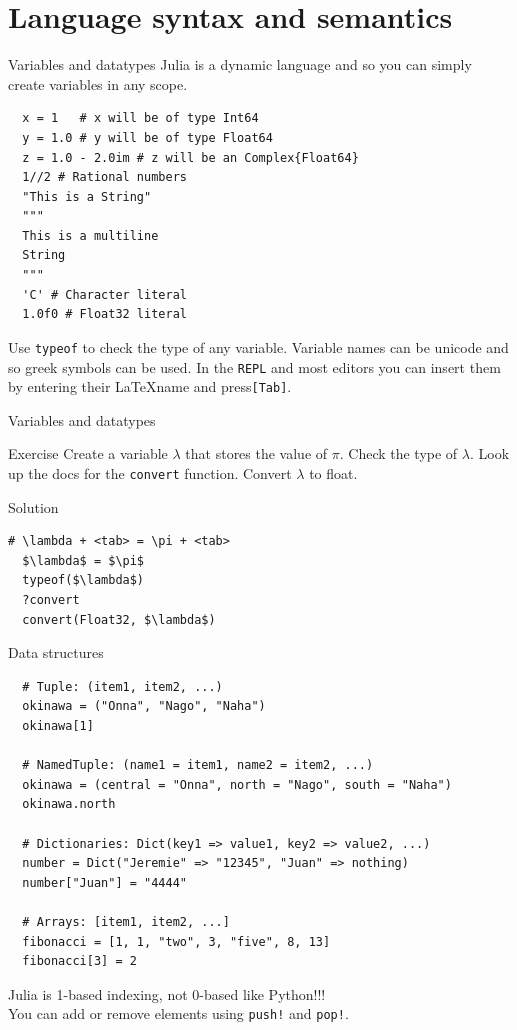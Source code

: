 \documentclass{beamer}
\begin{document}
\section{Language syntax and semantics}
\begin{frame}[fragile]{Variables and datatypes}
  Julia is a dynamic language and so you can simply create variables in any scope.
  \begin{lstlisting}
  x = 1   # x will be of type Int64
  y = 1.0 # y will be of type Float64
  z = 1.0 - 2.0im # z will be an Complex{Float64}
  1//2 # Rational numbers
  "This is a String"
  """
  This is a multiline
  String
  """
  'C' # Character literal
  1.0f0 # Float32 literal
  \end{lstlisting}
  Use \verb|typeof| to check the type of any variable. Variable names can be unicode and so greek symbols can be used.
  In the \verb|REPL| and most editors you can insert them by entering their \LaTeX name and press\verb|[Tab]|.
\end{frame}

\begin{frame}[fragile]{Variables and datatypes}
	
	\begin{block}{Exercise}
		Create a variable $\lambda$ that stores the value of $\pi$.
		Check the type of $\lambda$.
		Look up the docs for the \verb|convert| function.
		Convert $\lambda$ to float.
	\end{block}
	\vfill
	\begin{block}{Solution}
		\begin{lstlisting}[mathescape]
  # \lambda + <tab> = \pi + <tab>
  $\lambda$ = $\pi$
  typeof($\lambda$)
  ?convert
  convert(Float32, $\lambda$)
		\end{lstlisting}
	\end{block}
\end{frame}


\begin{frame}[fragile]{Data structures}
	\begin{lstlisting}
  # Tuple: (item1, item2, ...)
  okinawa = ("Onna", "Nago", "Naha")
  okinawa[1] 
		
  # NamedTuple: (name1 = item1, name2 = item2, ...)
  okinawa = (central = "Onna", north = "Nago", south = "Naha")
  okinawa.north 
		
  # Dictionaries: Dict(key1 => value1, key2 => value2, ...)
  number = Dict("Jeremie" => "12345", "Juan" => nothing)
  number["Juan"] = "4444"
		
  # Arrays: [item1, item2, ...]
  fibonacci = [1, 1, "two", 3, "five", 8, 13]
  fibonacci[3] = 2
	\end{lstlisting}

Julia is 1-based indexing, not 0-based like Python!!!\\
You can add or remove elements using \verb|push!| and \verb|pop!|.
\end{frame}
\end{document}
